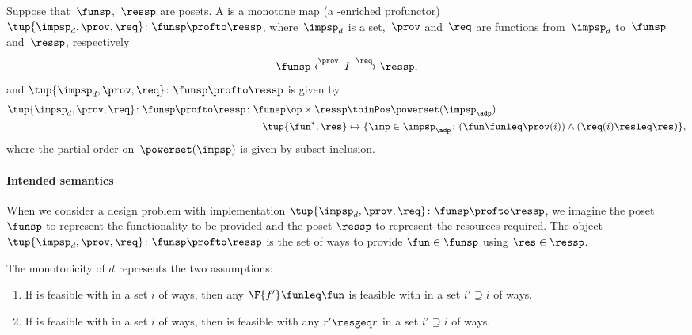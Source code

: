 \begin{definition}
    \label{def:dpwithimp}
    Suppose that~$\funsp$,~$\ressp$ are posets. A \emph{} is a monotone map (a \Set-enriched profunctor)~$\tup{\impsp_d,\prov,\req}\colon \funsp\profto \ressp$, where~$\impsp_d$ is a set,~$\prov$ and~$\req$ are functions from~$\impsp_d$ to~$\funsp$ and~$\ressp$, respectively
    \begin{equation*}
        \funsp \xleftarrow{\prov} I \xrightarrow{\req} \ressp,
    \end{equation*}
    and $\tup{\impsp_d,\prov,\req}\colon \funsp\profto \ressp$ is given by
    \begin{equation*}
        \begin{aligned}
            \tup{\impsp_d,\prov,\req}\colon \funsp\profto \ressp \colon \funsp\op \times \ressp &\toinPos \powerset(\impsp_\adp) \\
            \tup{\fun^*, \res} &\mapsto \{ \imp \in \impsp_\adp \colon ( \fun \funleq \prov(i)) \wedge (\req(i) \resleq \res) \},
        \end{aligned}
    \end{equation*}
    where the partial order on~$\powerset(\impsp)$ is given by subset inclusion.
\end{definition}

\paragraph{Intended semantics} When we consider a design problem with implementation $\tup{\impsp_d, \prov, \req}\colon \funsp\profto \ressp$, we imagine the poset $\funsp$ to represent the functionality to be provided and the poset $\ressp$ to represent the resources required. The object $\tup{\impsp_d,\prov,\req}\colon \funsp\profto \ressp$ is the set of ways to provide $\fun\in \funsp$ using $\res\in \ressp$.

\noindent The monotonicity of $d$ represents the two assumptions:
\begin{enumerate}
    \item If \fun is feasible with \res in a set $i$ of ways, then any $\F{f'}\funleq \fun$ is feasible with \res in a set $i'\supseteq i$ of ways.
    \item If \fun is feasible with \res in a set $i$ of ways, then \fun is feasible with any $r'\resgeq r$ in a set $i'\supseteq i$ of ways.
\end{enumerate}

